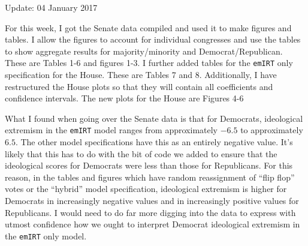 \documentclass[12pt]{article}
\begin{document}
	
	\begin{center}
		Update: 04 January 2017
	\end{center}

For this week, I got the Senate data compiled and used it to make figures and tables. I allow the figures to account for individual congresses and use the tables to show aggregate results for majority/minority and Democrat/Republican. These are Tables 1-6 and figures 1-3. I further added tables for the \verb|emIRT| only specification for the House. These are Tables 7 and 8. Additionally, I have restructured the House plots so that they will contain all coefficients and confidence intervals. The new plots for the House are Figures 4-6

What I found when going over the Senate data is that for Democrats, ideological extremism in the \verb|emIRT| model ranges from approximately $-6.5$ to approximately $6.5$. The other model specifications have this as an entirely negative value. It's likely that this has to do with the bit of code we added to ensure that the ideological scores for Democrats were less than those for Republicans. For this reason, in the tables and figures which have random reassignment of ``flip flop'' votes or the ``hybrid'' model specification, ideological extremism is higher for Democrats in increasingly negative values and in increasingly positive values for Republicans. I would need to do far more digging into the data to express with utmost confidence how we ought to interpret Democrat ideological extremism in the \verb|emIRT| only model.
\end{document}
